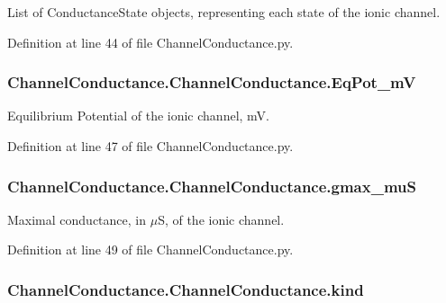 List of Conductance\-State objects, representing each state of the ionic channel. 



Definition at line 44 of file Channel\-Conductance.\-py.

\hypertarget{class_channel_conductance_1_1_channel_conductance_a654a73b6cd5853b509e7f7fba060572b}{
\subsubsection[{Eq\-Pot\-\_\-m\-V}]{\setlength{\rightskip}{0pt plus 5cm}Channel\-Conductance.\-Channel\-Conductance.\-Eq\-Pot\-\_\-m\-V}}\label{class_channel_conductance_1_1_channel_conductance_a654a73b6cd5853b509e7f7fba060572b}


Equilibrium Potential of the ionic channel, m\-V. 



Definition at line 47 of file Channel\-Conductance.\-py.

\hypertarget{class_channel_conductance_1_1_channel_conductance_a80a0238a90b30b411c9381f682d0aeec}{
\subsubsection[{gmax\-\_\-mu\-S}]{\setlength{\rightskip}{0pt plus 5cm}Channel\-Conductance.\-Channel\-Conductance.\-gmax\-\_\-mu\-S}}\label{class_channel_conductance_1_1_channel_conductance_a80a0238a90b30b411c9381f682d0aeec}


Maximal conductance, in $\mu$S, of the ionic channel. 



Definition at line 49 of file Channel\-Conductance.\-py.

\hypertarget{class_channel_conductance_1_1_channel_conductance_a7bf3e28aab2160014358cde589f2ec39}{
\subsubsection[{kind}]{\setlength{\rightskip}{0pt plus 5cm}Channel\-Conductance.\-Channel\-Conductance.\-kind}}\label{class_channel_conductance_1_1_channel_conductance_a7bf3e28aab2160014358cde589f2ec39}


